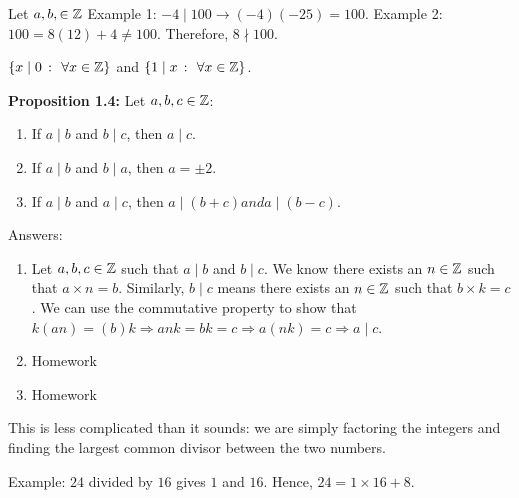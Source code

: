 
Let $a, b, \in \mathbb{Z}$  Example 1: $-4 \mid 100 \rightarrow (-4)(-25) = 100$. Example 2: $100 = 8(12) + 4 \ne 100$. Therefore, $8 \nmid 100$.

\begin{theorem}
    {} $\{x \mid 0 \ \colon \ \forall x \in \mathbb{Z}\}$ and $\{1 \mid x \ \colon \ \forall x \in \Z\}$.
\end{theorem}


\textbf{Proposition 1.4:} Let $a,b,c \in \mathbb{Z}$:
\begin{enumerate}
    \item If $a \mid b$ and $b \mid c$, then $a \mid c$.
    \item If $a \mid b$ and $b \mid a$, then $a = \pm 2$.
    \item If $a \mid b$ and $a \mid c$, then $a \mid (b + c) and a \mid (b - c)$.
\end{enumerate}

Answers:

\begin{enumerate}
    \item Let $a,b,c \in \mathbb{Z}$ such that $a \mid b$ and $b \mid c$. We know there exists an $n \in \mathbb{Z}$ such that $a \times n = b$. Similarly, $b \mid c$ means there exists an $n \in \mathbb{Z}$ such that $b\times k = c$. We can use the commutative property to show that $k(an) = (b)k \Rightarrow ank = bk = c \Rightarrow a(nk) = c \Rightarrow a \mid c$.
    \item Homework
    \item Homework
\end{enumerate}


This is less complicated than it sounds: we are simply factoring the integers and finding the largest common divisor between the two numbers. \\


Example: $24$ divided by $16$ gives $1$ and $16$. Hence, $24 = 1 \times 16 + 8$.

